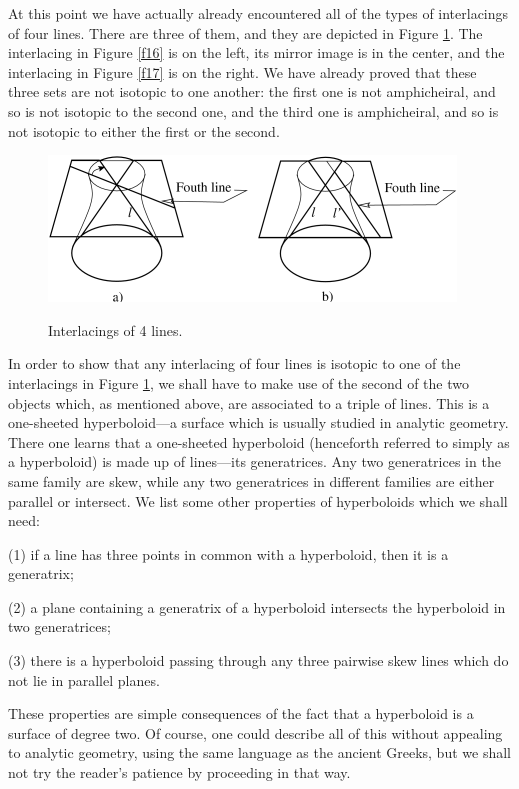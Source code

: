 \documentclass{article}
\begin{document}
At this point we have actually already encountered all of the types of
interlacings of four lines. There are three of them, and they are depicted in
Figure \ref{f24}. The interlacing in Figure \ref{f16} is on the left, 
its mirror image
is in the center, and the interlacing in Figure \ref{f17} is on the 
right. We have
already proved that these three sets are not isotopic to one another: the
first one is not amphicheiral, and so is not isotopic to 
the second
one, and the third one is amphicheiral, and so is not 
isotopic to either the first or the second.
\begin{figure}
{\includegraphics{imagesSkewlines/x24.png}}
\caption{Interlacings of 4 lines.}
\label{f24}
\end{figure}

In order to show that any interlacing of four lines is isotopic to one of the
interlacings in Figure \ref{f24}, we shall have to make use of the 
second of the two
objects which, as mentioned above, are associated to a triple of lines. This is
a one-sheeted hyperboloid---a surface which is usually studied in analytic
geometry. There one learns that a one-sheeted hyperboloid (henceforth
referred to simply as a hyperboloid) is made up of lines---its generatrices.
Any two generatrices in the same family are skew, while any two generatrices in
different families are either parallel or intersect. We list some other
properties of hyperboloids which we shall need:

(1) if a line has three points in common with a hyperboloid, then it is a
generatrix;

(2) a plane containing a generatrix of a hyperboloid intersects the hyperboloid
in two generatrices;

(3) there is a hyperboloid passing through any three pairwise skew lines which
do not lie in parallel planes.

These properties are simple consequences of the fact that a hyperboloid is a
surface of degree two. Of course, one could describe all of this without
appealing to analytic geometry, using the same language as the ancient Greeks,
but we shall not try the reader's patience by proceeding in that way.
\end{document}
